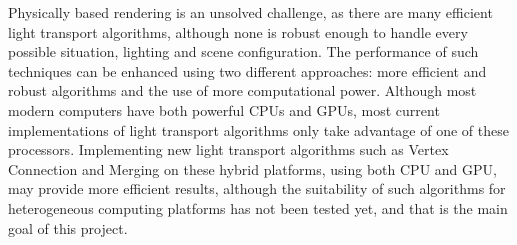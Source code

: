 Physically based rendering is an unsolved challenge, as there are many efficient light transport algorithms, although none is robust enough to handle every possible situation, lighting and scene configuration. The performance of such techniques can be enhanced using two different approaches: more efficient and robust algorithms and the use of more computational power. Although most modern computers have both powerful CPUs and GPUs, most current implementations of light transport algorithms only take advantage of one of these processors. Implementing new light transport algorithms such as Vertex Connection and Merging on these hybrid platforms, using both CPU and GPU, may provide more efficient results, although the suitability of such algorithms for heterogeneous computing platforms has not been tested yet, and that is the main goal of this project.